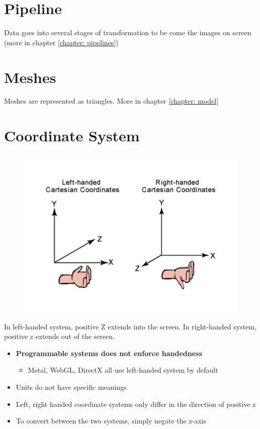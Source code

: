 \section{Pipeline}

  Data goes into several stages of transformation to be come the images on
  screen (more in chapter \ref{chapter: pipelines})

\section{Meshes}

  Meshes are represented as triangles. More in chapter \ref{chapter: model}

\section{Coordinate System}

  \begin{figure}[H]
    \centering
    \includegraphics[width=0.7\columnwidth]{images/overview/left-right-hand.png}
  \end{figure}

  In left-handed system, positive Z extends into the screen. In right-handed
  system, positive z extends out of the screen.

  \begin{itemize}
    \item \textbf{Programmable systems does not enforce handedness}
    \begin{itemize}
      \item Metal, WebGL, DirectX all use left-handed system by default
    \end{itemize}
    \item Units do not have specific meanings
    \item Left, right handed coordinate systems only differ in the direction of
    positive z
    \item To convert between the two systems, simply negate the z-axis
  \end{itemize}
